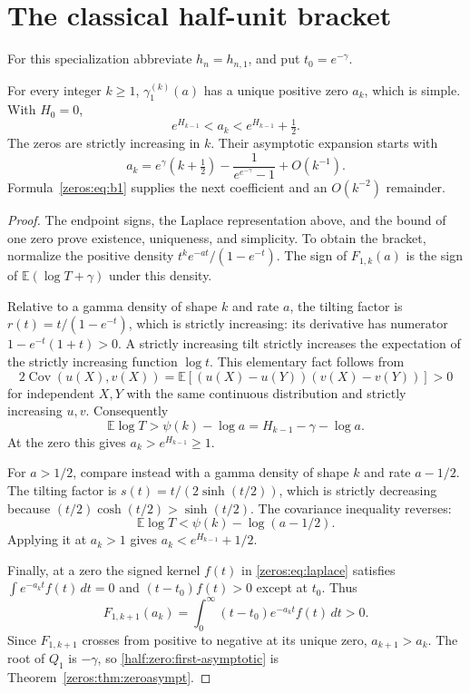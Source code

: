 \section{The classical half-unit bracket}
For this specialization abbreviate $h_n=h_{n,1}$, and put $t_0=e^{-\gamma}$.

\begin{theorem}\label{half:zero:first}
For every integer $k\geq1$, $\gamma_1^{(k)}(a)$ has a unique positive
zero $a_k$, which is simple.  With $H_0=0$,
\begin{equation}\label{half:zero:half-unit}
 e^{H_{k-1}}<a_k<e^{H_{k-1}}+\tfrac12.
\end{equation}
The zeros are strictly increasing in $k$.  Their asymptotic expansion
starts with
\begin{equation}\label{half:zero:first-asymptotic}
 a_k=e^\gamma\left(k+\tfrac12\right)
                     -\frac1{e^{e^{-\gamma}}-1}+O(k^{-1}).
\end{equation}
Formula~\eqref{zeros:eq:b1} supplies the next coefficient
and an $O(k^{-2})$ remainder.
\end{theorem}
\begin{proof}
The endpoint signs, the Laplace representation above,
and the bound of one zero prove existence, uniqueness, and simplicity.
To obtain the bracket, normalize the positive density
$t^k e^{-at}/(1-e^{-t})$.  The sign of $F_{1,k}(a)$ is the sign of
$\mathbb E(\log T+\gamma)$ under this density.

Relative to a gamma density of shape $k$ and rate $a$, the tilting
factor is
$r(t)=t/(1-e^{-t})$, which is strictly increasing: its derivative has
numerator $1-e^{-t}(1+t)>0$.  A strictly increasing tilt strictly
increases the expectation of the strictly increasing function
$\log t$.  This elementary fact follows from
\[
 2\operatorname{Cov}(u(X),v(X))
   =\mathbb E[(u(X)-u(Y))(v(X)-v(Y))]>0
\]
for independent $X,Y$ with the same continuous distribution and
strictly increasing $u,v$.  Consequently
\[
 \mathbb E\log T>\psi(k)-\log a
                 =H_{k-1}-\gamma-\log a.
\]
At the zero this gives $a_k>e^{H_{k-1}}\geq1$.

For $a>1/2$, compare instead with a gamma density of shape $k$
and rate $a-1/2$.  The tilting factor is
$s(t)=t/(2\sinh(t/2))$, which is strictly decreasing because
$(t/2)\cosh(t/2)>\sinh(t/2)$.  The covariance inequality reverses:
\[
 \mathbb E\log T<\psi(k)-\log(a-1/2).
\]
Applying it at $a_k>1$ gives $a_k<e^{H_{k-1}}+1/2$.

Finally, at a zero the signed kernel $f(t)$ in
\eqref{zeros:eq:laplace} satisfies $\int e^{-a_kt}f(t)\,dt=0$ and
$(t-t_0)f(t)>0$ except at $t_0$.  Thus
\[
 F_{1,k+1}(a_k)=\int_0^\infty (t-t_0)e^{-a_kt}f(t)\,dt>0.
\]
Since $F_{1,k+1}$ crosses from positive to negative at its unique
zero, $a_{k+1}>a_k$.  The root of $Q_1$ is $-\gamma$, so
\eqref{half:zero:first-asymptotic} is Theorem~\ref{zeros:thm:zeroasympt}.
\end{proof}

